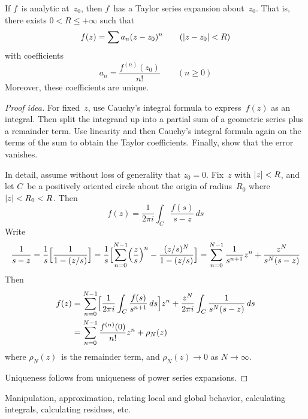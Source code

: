 \begin{thm}
If \(f\)~is analytic at~\(z_0\), then \(f\)~has a Taylor series expansion about~\(z_0\). That is, there exists \(0<R\le+\infty\) such that
\[f(z)=\sum a_n(z-z_0)^n\qquad(|{z-z_0}|<R)\]
with coefficients
\[a_n=\frac{f^{(n)}(z_0)}{n!}\qquad(n\ge0)\]
Moreover, these coefficients are unique.
\end{thm}
\begin{proof}[Proof idea]
For fixed~\(z\), use Cauchy's integral formula to express~\(f(z)\) as an integral. Then split the integrand up into a partial sum of a geometric series plus a remainder term. Use linearity and then Cauchy's integral formula again on the terms of the sum to obtain the Taylor coefficients. Finally, show that the error vanishes.

In detail, assume without loss of generality that \(z_0=0\). Fix~\(z\) with \(|{z}|<R\), and let \(C\)~be a positively oriented circle about the origin of radius~\(R_0\) where \(|{z}|<R_0<R\). Then
\[f(z)=\frac{1}{2\pi i}\int_C\frac{f(s)}{s-z}\,ds\]
Write
\[\frac{1}{s-z}
=\frac{1}{s}\Bigl[\frac{1}{1-(z/s)}\Bigr]
=\frac{1}{s}\Bigl[\sum_{n=0}^{N-1}\Bigl(\frac{z}{s}\Bigr)^n-\frac{(z/s)^N}{1-(z/s)}\Bigr]
=\sum_{n=0}^{N-1}\frac{1}{s^{n+1}}z^n+\frac{z^N}{s^N(s-z)}\]
Then
\begin{align*}
f(z)&=\sum_{n=0}^{N-1}\Bigl[\frac{1}{2\pi i}\int_C\frac{f(s)}{s^{n+1}}\,ds\Bigr]z^n+\frac{z^N}{2\pi i}\int_C\frac{1}{s^N(s-z)}\,ds\\
	&=\sum_{n=0}^{N-1}\frac{f^{(n)}(0)}{n!}z^n+\rho_N(z)
\end{align*}
where \(\rho_N(z)\)~is the remainder term, and \(\rho_N(z)\to0\) as \(N\to\infty\).

Uniqueness follows from uniqueness of power series expansions.
\end{proof}
\begin{app}
Manipulation, approximation, relating local and global behavior, calculating integrals, calculating residues, etc.
\end{app}

